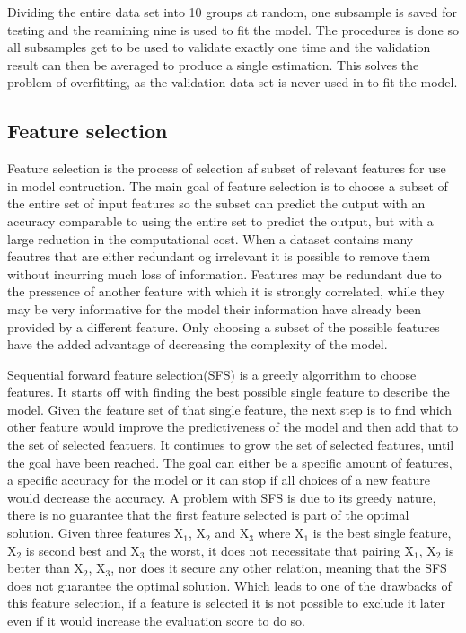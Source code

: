 Dividing the entire data set into 10 groups at random, one subsample is saved for testing and the reamining nine is used to fit the model. The procedures is done so all subsamples get to be used to validate exactly one time and the validation result can then be averaged to produce a single estimation. This solves the problem of overfitting, as the validation data set is never used in to fit the model.

\subsection{Feature selection}
Feature selection is the process of selection af subset of relevant features for use in model contruction.
The main goal of feature selection is to choose a subset of the entire set of input features so the subset can predict the output with an accuracy comparable to using the entire set to predict the output, but with a large reduction in the computational cost.
When a dataset contains many feautres that are either redundant og irrelevant it is possible to remove them without incurring much loss of information. Features may be redundant due to the pressence of another feature with which it is strongly correlated, while they may be very informative for the model their information have already been provided by a different feature. Only choosing a subset of the possible features have the added advantage of decreasing the complexity of the model.

Sequential forward feature selection(SFS) is a greedy algorrithm to choose features.
It starts off with finding the best possible single feature to describe the model. Given the feature set of that single feature, the next step is to find which other feature would improve the predictiveness of the model and then add that to the set of selected featuers. It continues to grow the set of selected features, until the goal have been reached. The goal can either be a specific amount of features, a specific accuracy for the model or it can stop if all choices of a new feature would decrease the accuracy.
A problem with SFS is due to its greedy nature, there is no guarantee that the first feature selected is part of the optimal solution. Given three features X$_1$, X$_2$ and X$_3$ where X$_1$ is the best single feature, X$_2$ is second best and X$_3$ the worst, it does not necessitate that pairing {X$_1$, X$_2$ } is better than {X$_2$, X$_3$}, nor does it secure any other relation, meaning that the SFS does not guarantee the optimal solution. Which leads to one of the drawbacks of this feature selection, if a feature is selected it is not possible to exclude it later even if it would increase the evaluation score to do so.

